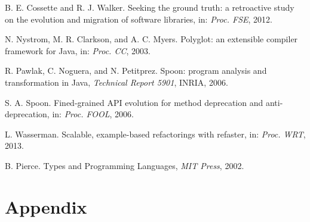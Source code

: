 \documentclass{sigplanconf}
\begin{document}
\begin{thebibliography}{}
    B. E. Cossette and R. J. Walker. Seeking the ground truth: a retroactive study on the 
    evolution and migration of software libraries, in: \emph{Proc. FSE}, 2012.


    N. Nystrom, M. R. Clarkson, and A. C. Myers.
    Polyglot: an extensible compiler framework for Java, in: \emph{Proc. CC}, 2003.

    R. Pawlak, C. Noguera, and N. Petitprez. Spoon: program analysis and transformation
    in Java, \emph{Technical Report 5901}, INRIA, 2006.

    S. A. Spoon. Fined-grained API evolution for method deprecation and anti-deprecation,
    in: \emph{Proc. FOOL}, 2006.

    L. Wasserman. Scalable, example-based refactorings with refaster,
    in: \emph{Proc. WRT}, 2013.

    B. Pierce. Types and Programming Languages, \emph{MIT Press}, 2002.


\end{thebibliography}


\section*{Appendix}
\appendix



%
\end{document}
